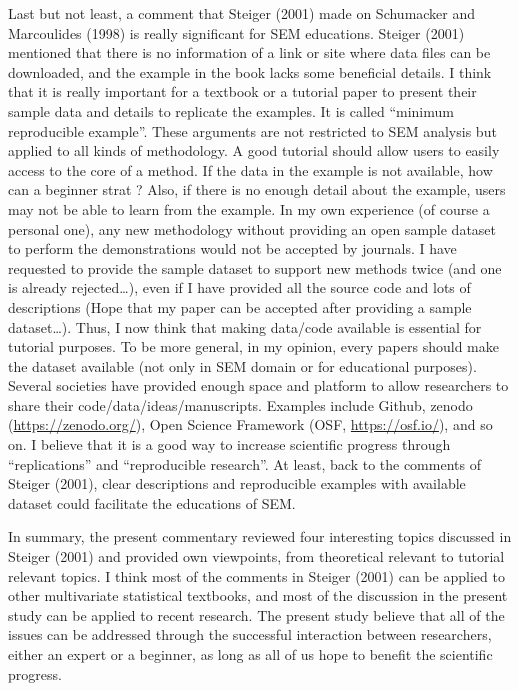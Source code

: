 \documentclass[jou]{apa6}
\theoremstyle{definition}
\theoremstyle{definition}
\theoremstyle{definition}
\theoremstyle{remark}
\begin{document}
Last but not least, a comment that Steiger (2001) made on Schumacker and
Marcoulides (1998) is really significant for SEM educations. Steiger
(2001) mentioned that there is no information of a link or site where
data files can be downloaded, and the example in the book lacks some
beneficial details. I think that it is really important for a textbook
or a tutorial paper to present their sample data and details to
replicate the examples. It is called \enquote{minimum reproducible
example}. These arguments are not restricted to SEM analysis but applied
to all kinds of methodology. A good tutorial should allow users to
easily access to the core of a method. If the data in the example is not
available, how can a beginner strat ? Also, if there is no enough detail
about the example, users may not be able to learn from the example. In
my own experience (of course a personal one), any new methodology
without providing an open sample dataset to perform the demonstrations
would not be accepted by journals. I have requested to provide the
sample dataset to support new methods twice (and one is already
rejected\ldots{}), even if I have provided all the source code and lots
of descriptions (Hope that my paper can be accepted after providing a
sample dataset\ldots{}). Thus, I now think that making data/code
available is essential for tutorial purposes. To be more general, in my
opinion, every papers should make the dataset available (not only in SEM
domain or for educational purposes). Several societies have provided
enough space and platform to allow researchers to share their
code/data/ideas/manuscripts. Examples include Github, zenodo
(\url{https://zenodo.org/}), Open Science Framework (OSF,
\url{https://osf.io/}), and so on. I believe that it is a good way to
increase scientific progress through \enquote{replications} and
\enquote{reproducible research}. At least, back to the comments of
Steiger (2001), clear descriptions and reproducible examples with
available dataset could facilitate the educations of SEM.

In summary, the present commentary reviewed four interesting topics
discussed in Steiger (2001) and provided own viewpoints, from
theoretical relevant to tutorial relevant topics. I think most of the
comments in Steiger (2001) can be applied to other multivariate
statistical textbooks, and most of the discussion in the present study
can be applied to recent research. The present study believe that all of
the issues can be addressed through the successful interaction between
researchers, either an expert or a beginner, as long as all of us hope
to benefit the scientific progress.
\end{document}
